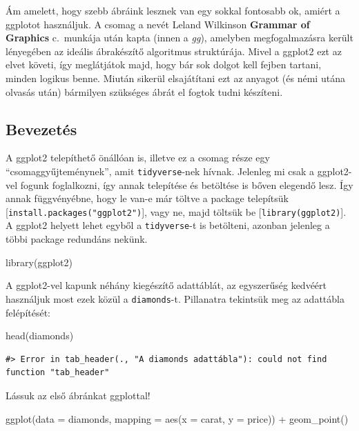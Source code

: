 \documentclass[
]{article}
\newenvironment{Shaded}{\begin{snugshade}}{\end{snugshade}}
\newcommand{\AttributeTok}[1]{\textcolor[rgb]{0.77,0.63,0.00}{#1}}
\newcommand{\FunctionTok}[1]{\textcolor[rgb]{0.00,0.00,0.00}{#1}}
\newcommand{\NormalTok}[1]{#1}
\newcommand{\SpecialCharTok}[1]{\textcolor[rgb]{0.00,0.00,0.00}{#1}}
\begin{document}
Ám amelett, hogy szebb ábráink lesznek van egy sokkal fontosabb ok, amiért a ggplotot használjuk. A csomag a nevét Leland Wilkinson \textbf{Grammar of Graphics} c.~munkája után kapta (innen a \emph{gg}), amelyben megfogalmazásra került lényegében az ideális ábrakészítő algoritmus struktúrája. Mivel a ggplot2 ezt az elvet követi, így meglátjátok majd, hogy bár sok dolgot kell fejben tartani, minden logikus benne. Miután sikerül elsajátítani ezt az anyagot (és némi utána olvasás után) bármilyen szükséges ábrát el fogtok tudni készíteni.

\hypertarget{bevezetuxe9s}{%
\subsection{Bevezetés}\label{bevezetuxe9s}}

A ggplot2 telepíthető önállóan is, illetve ez a csomag része egy ``csomaggyűjteménynek'', amit \texttt{tidyverse}-nek hívnak. Jelenleg mi csak a ggplot2-vel fogunk foglalkozni, így annak telepítése és betöltése is bőven elegendő lesz. Így annak függvényébne, hogy le van-e már töltve a package telepítsük {[}\texttt{install.packages("ggplot2")}{]}, vagy ne, majd töltsük be {[}\texttt{library(ggplot2)}{]}. A ggplot2 helyett lehet egyből a \texttt{tidyverse}-t is betölteni, azonban jelenleg a többi package redundáns nekünk.

\begin{Shaded}
\begin{Highlighting}[]
\FunctionTok{library}\NormalTok{(ggplot2)}
\end{Highlighting}
\end{Shaded}

A ggplot2-vel kapunk néhány kiegészítő adattáblát, az egyszerűség kedvéért használjuk most ezek közül a \texttt{diamonds}-t. Pillanatra tekintsük meg az adattábla felépítését:

\begin{Shaded}
\begin{Highlighting}[]
\FunctionTok{head}\NormalTok{(diamonds)}
\end{Highlighting}
\end{Shaded}

\begin{verbatim}
#> Error in tab_header(., "A diamonds adattábla"): could not find function "tab_header"
\end{verbatim}

Lássuk az első ábránkat ggplottal!

\begin{Shaded}
\begin{Highlighting}[]
\FunctionTok{ggplot}\NormalTok{(}\AttributeTok{data =}\NormalTok{ diamonds, }\AttributeTok{mapping =} \FunctionTok{aes}\NormalTok{(}\AttributeTok{x =}\NormalTok{ carat, }\AttributeTok{y =}\NormalTok{ price)) }\SpecialCharTok{+}
  \FunctionTok{geom\_point}\NormalTok{()}
\end{Highlighting}
\end{Shaded}
\end{document}
